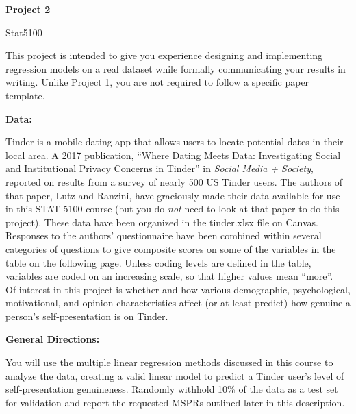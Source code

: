 \documentclass[12pt]{report}
\begin{document}
\Large
\begin{center}
   \textbf{Project 2}
   
\vspace{0.5cm}
   
 Stat5100
  
\end{center}
\normalsize

This project is intended to give you experience designing and implementing regression models on a real dataset while formally communicating your results in writing. Unlike Project 1, you are not required to follow a specific paper template.

\vspace{1em}

\large{\bf Data:}\\
\normalsize

Tinder is a mobile dating app that allows users to locate potential dates in their local area.
A 2017 publication, ``Where Dating Meets Data: Investigating
 Social and Institutional Privacy Concerns in Tinder'' in {\it Social Media + Society}, reported on results from a survey of
 nearly 500 US Tinder users.  The authors of that paper, Lutz and Ranzini, have graciously made their data available
for use in this STAT 5100 course (but you do {\it not} need to look at that paper to do this project).
These data have been organized in the tinder.xlsx file on Canvas.\\

Responses to the authors' questionnaire have been combined within several categories of questions
to give composite scores on some of the variables in the table on the following page.
Unless coding levels are defined in the table, variables
are coded on an increasing scale, so that higher values mean ``more''.\\

Of interest in this project is whether and
how various demographic, psychological, motivational, and opinion characteristics
affect (or at least predict) how genuine a person's self-presentation is on Tinder.\\

\vspace{1em}

\large {\bf General Directions:}
\normalsize

\vspace{1em}

You will use the multiple linear regression methods discussed
in this course to analyze the data, creating a valid linear model to
predict a Tinder user's level of self-presentation genuineness.  Randomly withhold 10\% of the data as a test set for validation and report the requested MSPRs outlined later in this description. \\
\end{document}
